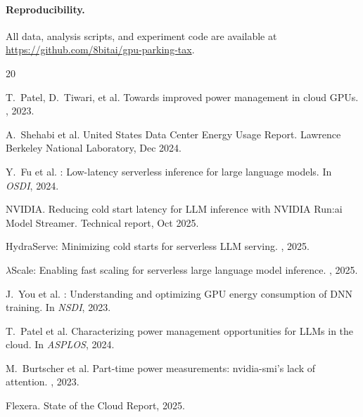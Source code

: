 \documentclass[sigconf,nonacm]{acmart}
\begin{document}
\paragraph{Reproducibility.} All data, analysis scripts, and experiment code are available at \href{https://github.com/8bitai/gpu-parking-tax}{https://github.com/8bitai/gpu-parking-tax}.


\def\bibfont{\normalsize}
\begin{thebibliography}{20}

T.~Patel, D.~Tiwari, et al.
\newblock Towards improved power management in cloud GPUs.
, 2023.

A.~Shehabi et al.
 United States Data Center Energy Usage Report.
\newblock Lawrence Berkeley National Laboratory, Dec 2024.

Y.~Fu et al.
: Low-latency serverless inference for large language models.
\newblock In {\em OSDI}, 2024.

NVIDIA.
\newblock Reducing cold start latency for LLM inference with {NVIDIA Run:ai} Model Streamer.
\newblock Technical report, Oct 2025.

HydraServe: Minimizing cold starts for serverless LLM serving.
, 2025.

$\lambda$Scale: Enabling fast scaling for serverless large language model inference.
, 2025.

J.~You et al.
: Understanding and optimizing GPU energy consumption of DNN training.
\newblock In {\em NSDI}, 2023.

T.~Patel et al.
\newblock Characterizing power management opportunities for LLMs in the cloud.
\newblock In {\em ASPLOS}, 2024.

M.~Burtscher et al.
\newblock Part-time power measurements: nvidia-smi's lack of attention.
, 2023.

Flexera.
 State of the Cloud Report, 2025.


\end{thebibliography}
\end{document}
